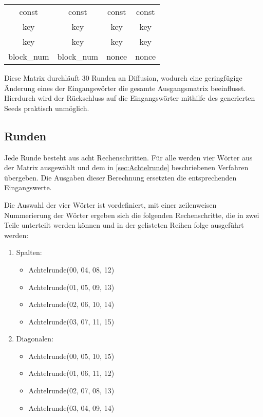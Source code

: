 \documentclass[10pt,a4paper]{article}
\begin{document}
\begin{center}
    \begin{tabular}{ c c c c }
        const      & const      & const & const \\
        key        & key        & key   & key   \\
        key        & key        & key   & key   \\
        block\_num & block\_num & nonce & nonce \\
    \end{tabular}
\end{center}

Diese Matrix durchläuft 30 Runden an Diffusion, wodurch eine geringfügige Änderung eines der Eingangswörter die gesamte Ausgangsmatrix beeinflusst.
Hierdurch wird der Rückschluss auf die Eingangswörter mithilfe des generierten Seeds praktisch unmöglich.

\subsection{Runden}

Jede Runde besteht aus acht Rechenschritten.
Für alle werden vier Wörter aus der Matrix ausgewählt und dem in \autoref{sec:Achtelrunde} beschriebenen Verfahren übergeben.
Die Ausgaben dieser Berechnung ersetzten die entsprechenden Eingangswerte.

Die Auswahl der vier Wörter ist vordefiniert, mit einer zeilenweisen Nummerierung der Wörter ergeben sich die folgenden Rechenschritte, die in zwei Teile unterteilt werden können und in der gelisteten Reihen folge ausgeführt werden:
\begin{enumerate}
    \item Spalten:
          \begin{itemize}
              \item Achtelrunde(00, 04, 08, 12)
              \item Achtelrunde(01, 05, 09, 13)
              \item Achtelrunde(02, 06, 10, 14)
              \item Achtelrunde(03, 07, 11, 15)
          \end{itemize}
    \item Diagonalen:
          \begin{itemize}
              \item Achtelrunde(00, 05, 10, 15)
              \item Achtelrunde(01, 06, 11, 12)
              \item Achtelrunde(02, 07, 08, 13)
              \item Achtelrunde(03, 04, 09, 14)
          \end{itemize}
\end{enumerate}
\end{document}
